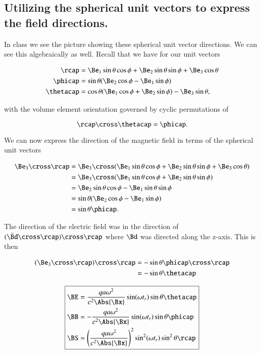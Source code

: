\subsection{Utilizing the spherical unit vectors to express the field directions.}

In class we see the picture showing these spherical unit vector directions.  We can see this algebraically as well.  Recall that we have for our unit vectors

\begin{align}\label{eqn:relativisticElectrodynamicsL21:260}
\rcap &= \Be_1 \sin\theta \cos\phi + \Be_2 \sin\theta \sin\phi + \Be_3 \cos\theta \\
\phicap &= \sin\theta ( \Be_2 \cos\phi - \Be_1 \sin\phi ) \\
\thetacap &= \cos\theta ( \Be_1 \cos\phi + \Be_2 \sin\phi ) - \Be_3 \sin\theta,
\end{align}

with the volume element orientation governed by cyclic permutations of

\begin{equation}\label{eqn:relativisticElectrodynamicsL21:280}
\rcap \cross \thetacap = \phicap.
\end{equation}

We can now express the direction of the magnetic field in terms of the spherical unit vectors

\begin{align*}
\Be_3 \cross \rcap
&=
\Be_3 \cross (\Be_1 \sin\theta \cos\phi + \Be_2 \sin\theta \sin\phi + \Be_3 \cos\theta ) \\
&=
\Be_3 \cross (\Be_1 \sin\theta \cos\phi + \Be_2 \sin\theta \sin\phi ) \\
&=
\Be_2 \sin\theta \cos\phi - \Be_1 \sin\theta \sin\phi  \\
&=
\sin\theta ( \Be_2 \cos\phi - \Be_1 \sin\phi ) \\
&=
\sin\theta \phicap.
\end{align*}

The direction of the electric field was in the direction of $(\ddot{\Bd} \cross \rcap) \cross \rcap$ where $\Bd$ was directed along the z-axis.  This is then

\begin{align*}
(\Be_3 \cross \rcap) \cross \rcap
&=
-\sin\theta \phicap \cross \rcap \\
&=
-\sin\theta \thetacap
\end{align*}

\begin{equation}\label{eqn:relativisticElectrodynamicsL21:140b}
\boxed{
\begin{aligned}
\BE &= \frac{ q a \omega^2 }{c^2 \Abs{\Bx}} \sin(\omega t_r) \sin\theta \thetacap \\
\BB &= -\frac{ q a \omega^2 }{c^2 \Abs{\Bx}} \sin(\omega t_r) \sin\theta \phicap \\
\BS &= \left( \frac{ q a \omega^2 }{c^2 \Abs{\Bx}} \right)^2 \sin^2(\omega t_r) \sin^2\theta \rcap 
\end{aligned}
}
\end{equation}

